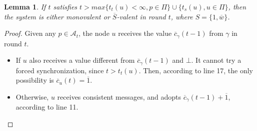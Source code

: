 \documentclass{article}
\newtheorem{lemma}{Lemma}[section]
\newcommand{\cent}{\gamma}
\newcommand{\ts}{t_{s}}
\newcommand{\try}{t_{t}}
\begin{document}
\begin{lemma}\label{lem:mono_bi}
	If $t$ satisfies $t > max \{\try(u) < \infty, p \in \Pi\} \cup \{\ts(u), u \in \Pi\}$,
	then the system is either monovalent or $\overline{S}$-valent in round $t$, where $S = \{1, \overline{w}\}$.
\end{lemma}
\begin{proof}
	Given any $p \in \mathcal{A}_t$, the node $u$ receives the value $\overline{c}_\cent(t-1)$ from $\cent$ in round $t$.
	\begin{itemize}
		\item If $u$ also receives a value different from $\overline{c}_\cent(t-1)$ and $\bot$.
			It cannot try a forced synchronization, since $t > \try(u)$.
			Then, according to line 17, the only possibility is $\overline{c}_u(t) = \overline{1}$.
		\item Otherwise, $u$ receives consistent messages, and adopts $\overline{c}_\cent(t-1)+\overline{1}$, according to line 11.
	\end{itemize}
\end{proof}
\end{document}
